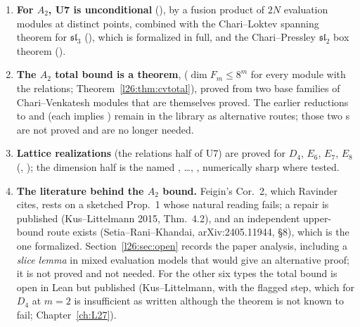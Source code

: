 \begin{enumerate}
  ), by Kac's lemma and a kernel-checked nilpotency certificate.
\item \textbf{For $A_2$, U7 is unconditional} (), by a fusion product of
  $2N$ evaluation modules at distinct points, combined with the Chari--Loktev spanning theorem for $\mathfrak{sl}_3$
  (), which is formalized in full, and the Chari--Pressley $\mathfrak{sl}_2$ box theorem ().
\item \textbf{The $A_2$ total bound is a theorem},  ($\dim F_m\le 8^m$ for every module with the
  relations; Theorem~\ref{l26:thm:cvtotal}), proved from two base families of Chari--Venkatesh modules that are themselves proved.
  The earlier reductions to  and  (each implies ) remain in the
  library as alternative routes; those two s are not proved and are no longer needed.
\item \textbf{Lattice realizations} (the relations half of U7) are proved for $D_4$, $E_6$, $E_7$, $E_8$
  (, ); the dimension half is the named , \dots,
  , numerically sharp where tested.
\item \textbf{The literature behind the $A_2$ bound.} Feigin's Cor.~2, which Ravinder cites, rests on a sketched Prop.~1
  whose natural reading fails; a repair is published (Kus--Littelmann 2015, Thm.~4.2), and an independent upper-bound route exists
  (Setia--Rani--Khandai, arXiv:2405.11944, \S8), which is the one formalized. Section~\ref{l26:sec:open} records the paper
  analysis, including a \emph{slice lemma} in mixed evaluation models that would give an alternative proof; it is not proved and
  not needed. For the other six types the total bound is open in Lean but published (Kus--Littelmann, with the flagged step,
  which for $D_4$ at $m=2$ is insufficient as written although the theorem is not known to fail; Chapter~\ref{ch:L27}).
\end{enumerate}

